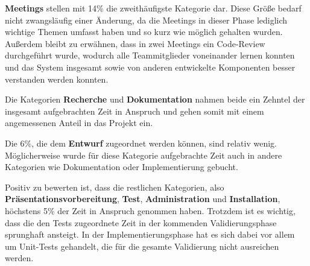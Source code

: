 \documentclass[../review_2.tex]{subfiles}
\begin{document}
\textbf{Meetings} stellen mit 14\% die zweithäufigste Kategorie dar. Diese Größe bedarf nicht zwangsläufig einer Änderung, da die Meetings in dieser Phase lediglich wichtige Themen umfasst haben und so kurz wie möglich gehalten wurden. Außerdem bleibt zu erwähnen, dass in zwei Meetings ein Code-Review durchgeführt wurde, wodurch alle Teammitglieder voneinander lernen konnten und das System insgesamt sowie von anderen entwickelte Komponenten besser verstanden werden konnten.

Die Kategorien \textbf{Recherche} und \textbf{Dokumentation} nahmen beide ein Zehntel der insgesamt aufgebrachten Zeit in Anspruch und gehen somit mit einem angemessenen Anteil in das Projekt ein.

Die 6\%, die dem \textbf{Entwurf} zugeordnet werden können, sind relativ wenig. Möglicherweise wurde für diese Kategorie aufgebrachte Zeit auch in andere Kategorien wie Dokumentation oder Implementierung gebucht.

Positiv zu bewerten ist, dass die restlichen Kategorien, also \textbf{Präsentationsvorbereitung}, \textbf{Test}, \textbf{Administration} und \textbf{Installation}, höchstens 5\% der Zeit in Anspruch genommen haben. Trotzdem ist es wichtig, dass die den Tests zugeordnete Zeit in der kommenden Validierungsphase sprunghaft ansteigt. In der Implementierungsphase hat es sich dabei vor allem um Unit-Tests gehandelt, die für die gesamte Validierung nicht ausreichen 
werden.
\end{document}
